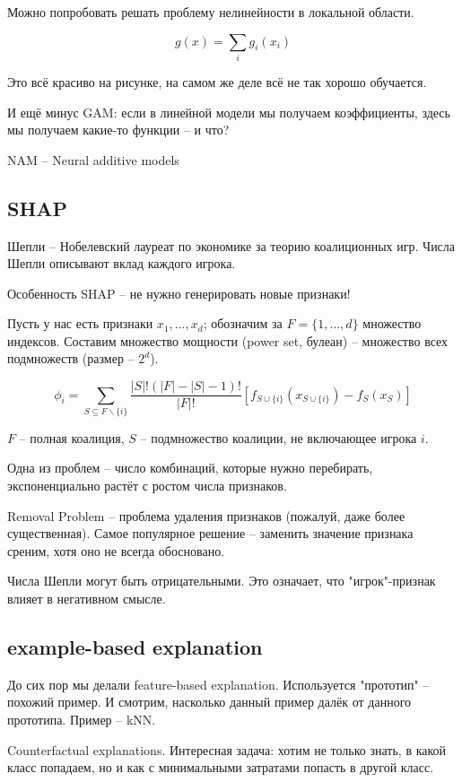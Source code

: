\documentclass[a4paper,12pt]{article}
\begin{document}
Можно попробовать решать проблему нелинейности в локальной области.

\[ g(x) = \sum_i g_i(x_i) \]

Это всё красиво на рисунке, на самом же деле всё не так хорошо обучается.

И ещё минус GAM: если в линейной модели мы получаем коэффициенты, здесь мы получаем какие-то функции -- и что?

NAM -- Neural additive models

\subsection{SHAP}

Шепли -- Нобелевский лауреат по экономике за теорию коалиционных игр.
Числа Шепли описывают вклад каждого игрока.

Особенность SHAP -- не нужно генерировать новые признаки!

Пусть у нас есть признаки $ x_1, \dots, x_d $; обозначим за $ F = \{ 1, \dots, d \} $ множество индексов.
Составим множество мощности (power set, булеан) -- множество всех подмножеств (размер -- $ 2^d $).

\[ \phi_i = \sum_{S \subseteq  F \backslash \{i\}} \frac{|S|! (|F|-|S|-1)!}{|F|!} [ f_{S \cup \{i\}} \left( x_{S \cup \{i\}} \right) - f_S \left(x_S\right) ] \]

$ F $ -- полная коалиция, $ S $ -- подмножество коалиции, не включающее игрока $ i $.

Одна из проблем -- число комбинаций, которые нужно перебирать, экспоненциально растёт с ростом числа признаков.

Removal Problem -- проблема удаления признаков (пожалуй, даже более существенная).
Самое популярное решение -- заменить значение признака среним, хотя оно не всегда обосновано.

Числа Шепли могут быть отрицательными.
Это означает, что "игрок"-признак влияет в негативном смысле.

\subsection{example-based explanation}

До сих пор мы делали feature-based explanation.
Используется "прототип"\hspace{0pt} -- похожий пример.
И смотрим, насколько данный пример далёк от данного прототипа.
Пример -- kNN.

Counterfactual explanations.
Интересная задача: хотим не только знать, в какой класс попадаем, но и как с минимальными затратами попасть в другой класс.
\end{document}
